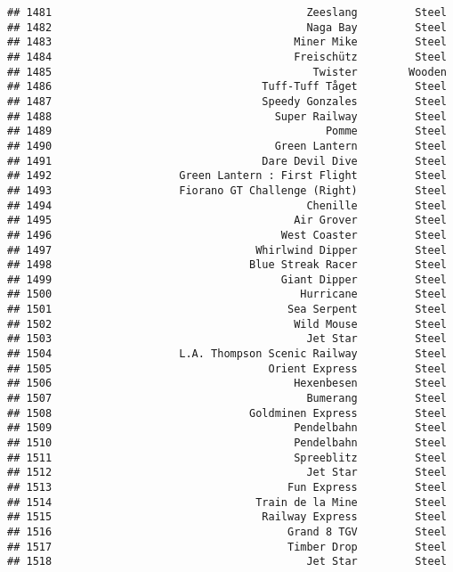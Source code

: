 \documentclass[
]{article}
\begin{document}
\begin{verbatim}
## 1481                                        Zeeslang         Steel
## 1482                                        Naga Bay         Steel
## 1483                                      Miner Mike         Steel
## 1484                                      Freischütz         Steel
## 1485                                         Twister        Wooden
## 1486                                 Tuff-Tuff Tåget         Steel
## 1487                                 Speedy Gonzales         Steel
## 1488                                   Super Railway         Steel
## 1489                                           Pomme         Steel
## 1490                                   Green Lantern         Steel
## 1491                                 Dare Devil Dive         Steel
## 1492                    Green Lantern : First Flight         Steel
## 1493                    Fiorano GT Challenge (Right)         Steel
## 1494                                        Chenille         Steel
## 1495                                      Air Grover         Steel
## 1496                                    West Coaster         Steel
## 1497                                Whirlwind Dipper         Steel
## 1498                               Blue Streak Racer         Steel
## 1499                                    Giant Dipper         Steel
## 1500                                       Hurricane         Steel
## 1501                                     Sea Serpent         Steel
## 1502                                      Wild Mouse         Steel
## 1503                                        Jet Star         Steel
## 1504                    L.A. Thompson Scenic Railway         Steel
## 1505                                  Orient Express         Steel
## 1506                                      Hexenbesen         Steel
## 1507                                        Bumerang         Steel
## 1508                               Goldminen Express         Steel
## 1509                                      Pendelbahn         Steel
## 1510                                      Pendelbahn         Steel
## 1511                                      Spreeblitz         Steel
## 1512                                        Jet Star         Steel
## 1513                                     Fun Express         Steel
## 1514                                Train de la Mine         Steel
## 1515                                 Railway Express         Steel
## 1516                                     Grand 8 TGV         Steel
## 1517                                     Timber Drop         Steel
## 1518                                        Jet Star         Steel

\end{verbatim}
\end{document}

